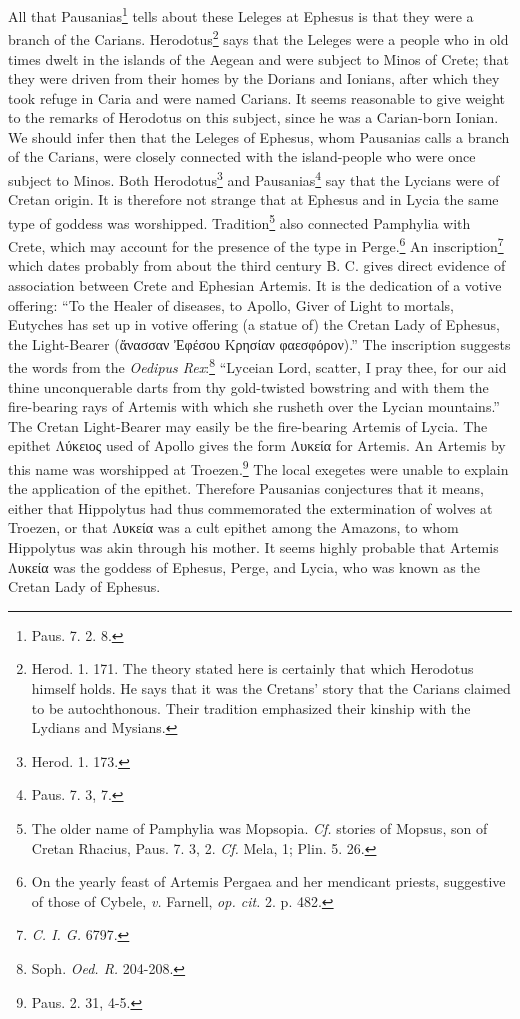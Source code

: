 \documentclass[a4paper, 12pt, oneside]{article}
\begin{document}
All that Pausanias\footnote{Paus. 7. 2. 8.} tells about these Leleges at Ephesus is that they were a branch of the Carians. Herodotus\footnote{Herod. 1. 171. The theory stated here is certainly that which Herodotus himself holds. He says that it was the Cretans' story that the Carians claimed to be autochthonous. Their tradition emphasized their kinship with the Lydians and Mysians.} says that the Leleges were a people who in old times dwelt in the islands of the Aegean and were subject to Minos of Crete; that they were driven from their homes by the Dorians and Ionians, after which they took refuge in Caria and were named Carians. It seems reasonable to give weight to the remarks of Herodotus on this subject, since he was a Carian-born Ionian. We should infer then that the Leleges of Ephesus, whom Pausanias calls a branch of the Carians, were closely connected with the island-people who were once subject to Minos. Both Herodotus\footnote{Herod. 1. 173.} and Pausanias\footnote{Paus. 7. 3, 7.} say that the Lycians were of Cretan origin. It is therefore not strange that at Ephesus and in Lycia the same type of goddess was worshipped. Tradition\footnote{The older name of Pamphylia was Mopsopia. \emph{Cf.} stories of Mopsus, son of Cretan Rhacius, Paus. 7. 3, 2. \emph{Cf.} Mela, 1; Plin. 5. 26.} also connected Pamphylia with Crete, which may account for the presence of the type in Perge.\footnote{On the yearly feast of Artemis Pergaea and her mendicant priests, suggestive of those of Cybele, \emph{v.} Farnell, \emph{op. cit.} 2. p. 482.} An inscription\footnote{\emph{C. I. G.} 6797.} which dates probably from about the third century B. C. gives direct evidence of association between Crete and Ephesian Artemis. It is the dedication of a votive offering: ``To the Healer of diseases, to Apollo, Giver of Light to mortals, Eutyches has set up in votive offering (a statue of) the Cretan Lady of Ephesus, the Light-Bearer (ἄνασσαν Ἐφέσου Κρησίαν φαεσφόρον).'' The inscription suggests the words from the \emph{Oedipus Rex}:\footnote{Soph. \emph{Oed. R.} 204-208.} ``Lyceian Lord, scatter, I pray thee, for our aid thine unconquerable darts from thy gold-twisted bowstring and with them the fire-bearing rays of Artemis with which she rusheth over the Lycian mountains.'' The Cretan Light-Bearer may easily be the fire-bearing Artemis of Lycia. The epithet Λύκειος used of Apollo gives the form Λυκεία for Artemis. An Artemis by this name was worshipped at Troezen.\footnote{Paus. 2. 31, 4-5.} The local exegetes were unable to explain the application of the epithet. Therefore Pausanias conjectures that it means, either that Hippolytus had thus commemorated the extermination of wolves at Troezen, or that Λυκεία was a cult epithet among the Amazons, to whom Hippolytus was akin through his mother. It seems highly probable that Artemis Λυκεία was the goddess of Ephesus, Perge, and Lycia, who was known as the Cretan Lady of Ephesus.
\end{document}
